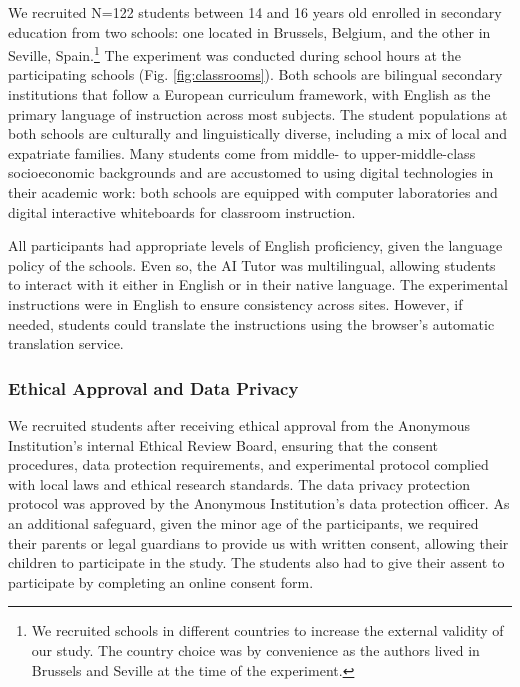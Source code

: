 \documentclass[
  12pt,
]{article}
\begin{document}
We recruited N=122 students between 14 and 16 years old enrolled in secondary education from two schools: one located in Brussels, Belgium, and the other in Seville, Spain.\footnote{We recruited schools in different countries to increase the external validity of our study. The country choice was by convenience as the authors lived in Brussels and Seville at the time of the experiment.} The experiment was conducted during school hours at the participating schools (Fig. \ref{fig:classrooms}). Both schools are bilingual secondary institutions that follow a European curriculum framework, with English as the primary language of instruction across most subjects. The student populations at both schools are culturally and linguistically diverse, including a mix of local and expatriate families. Many students come from middle- to upper-middle-class socioeconomic backgrounds and are accustomed to using digital technologies in their academic work: both schools are equipped with computer laboratories and digital interactive whiteboards for classroom instruction.

All participants had appropriate levels of English proficiency, given the language policy of the schools. Even so, the AI Tutor was multilingual, allowing students to interact with it either in English or in their native language. The experimental instructions were in English to ensure consistency across sites. However, if needed, students could translate the instructions using the browser's automatic translation service.

\subsubsection{Ethical Approval and Data Privacy}\label{ethical-approval-and-data-privacy}

We recruited students after receiving ethical approval from the Anonymous Institution's internal Ethical Review Board, ensuring that the consent procedures, data protection requirements, and experimental protocol complied with local laws and ethical research standards. The data privacy protection protocol was approved by the Anonymous Institution's data protection officer. As an additional safeguard, given the minor age of the participants, we required their parents or legal guardians to provide us with written consent, allowing their children to participate in the study. The students also had to give their assent to participate by completing an online consent form.
\end{document}
